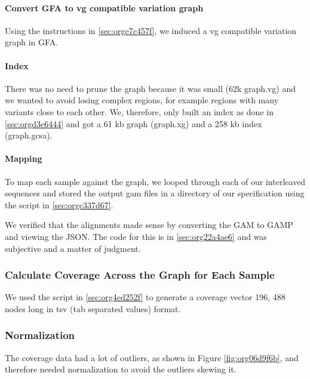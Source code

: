 \documentclass[10pt, a4paper]{article}
\begin{document}
\paragraph{Convert GFA to vg compatible variation graph}
\label{sec:orgfbf48a6}
Using the instructions in \ref{sec:orge7c457f}, we induced a vg 
\cite{garrisonVariationGraphToolkit2018} compatible variation graph in GFA.

\paragraph{Index}
\label{sec:org033fa60}
There was no need to prune the graph because it was small (62k graph.vg) and we 
wanted to avoid losing complex regions, for example regions with many variants
close to each other.
We, therefore, only built an index as done in \ref{sec:orgd3e6444} and got a 61 kb 
graph (graph.xg) and a 258 kb index (graph.gcsa).

\paragraph{Mapping}
\label{sec:org65bcb64}
To map each sample against the graph, we looped through each of our interleaved 
sequences and stored the output gam files in a directory of our specification
using the script in \ref{sec:orgc337d67}.

We verified that the alignments made sense by converting the GAM to GAMP and
viewing the JSON. The code for this is in \ref{sec:org22a4ae6} and was subjective and a 
matter of judgment.

\subsubsection{Calculate Coverage Across the Graph for Each Sample}
\label{sec:org4f11274}
We used the script in \ref{sec:org4ed252f} to generate a coverage vector 196, 488 nodes
long in tsv (tab separated values) format.

\subsubsection{Normalization}
\label{sec:org752d25e}
The coverage data had a lot of outliers, as shown in Figure
\ref{fig:org06d9f6b}, and therefore needed normalization to avoid the outliers
skewing it.
\end{document}
